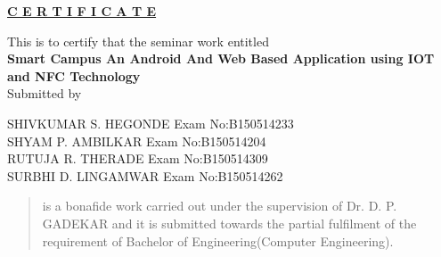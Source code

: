 \documentclass[10pt,a4paper]
{article}
\numberwithin{table}{section}
\begin{document}
\vspace{0.1in}
\begin{center}
\textbf{\underline{C E R T I F I C A T E}}\\
\vspace{0.05in}
\end{center}
		\noindent
  				\setlength{\baselineskip}{1.5\baselineskip}
	\begin{center}
This is to certify that the seminar work entitled\\
\vspace{0.03in}
		\textbf{\large  Smart Campus An Android And Web Based Application using IOT and NFC Technology  }\\
\singlespace
\vspace{0.02in}
Submitted by \\
\begin{center}	
	
SHIVKUMAR S. HEGONDE \hspace{10mm} Exam No:B150514233\\
SHYAM P. AMBILKAR \hspace{17.6 mm} Exam No:B150514204   \\
RUTUJA R. THERADE    \hspace{18.2 mm} Exam No:B150514309  \\
SURBHI D. LINGAMWAR \hspace{13.4 mm} Exam No:B150514262   \\
\end{center}
\end{center}
\vspace{0.05in}
\onehalfspace
\begin{quote}
is a bonafide work carried out under the supervision of Dr. D. P. GADEKAR  and it is\linebreak
submitted towards the partial fulfilment of the requirement of Bachelor of \linebreak Engineering(Computer Engineering).\\   		\end{quote}
		
\end{document}
